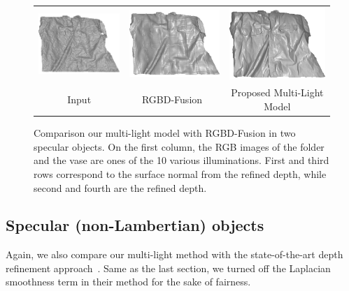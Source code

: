 \begin{figure}[!ht]
{\begin{tabular}{c|c c}
   \includegraphics[height = 0.24\linewidth]{figures/result/robust_patternShirt_shape_init.pdf} 
   &
   \includegraphics[height = 0.24\linewidth]{figures/result/rgbd_patternShirt_shape.pdf} &
   \includegraphics[height = 0.24\linewidth]{figures/result/robust_patternShirt_shape.pdf}\\

   {Input} & {RGBD-Fusion~\cite{or2015rgbd}} & {Proposed Multi-Light Model}               
 \end{tabular}}
\caption{Comparison our multi-light model with RGBD-Fusion in two specular objects. On the first column, the RGB images of the folder and the vase are ones of  the 10 various illuminations. First and third rows correspond to the surface normal from the refined depth, while second and fourth are the refined depth.}
\label{fig:comp_complicated_albedo}
\end{figure}

\subsection{Specular (non-Lambertian) objects}
Again, we also compare our multi-light method with the state-of-the-art depth refinement approach~\cite{or2015rgbd}.
Same as the last section, we turned off the Laplacian smoothness term in their method for the sake of fairness.

